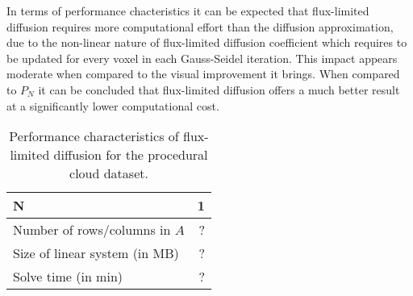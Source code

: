 In terms of performance chacteristics it can be expected that flux-limited diffusion requires more computational effort than the diffusion approximation, due to the non-linear nature of flux-limited diffusion coefficient which requires to be updated for every voxel in each Gauss-Seidel iteration. This impact appears moderate when compared to the visual improvement it brings. When compared to $P_N$ it can be concluded that flux-limited diffusion offers a much better result at a significantly lower computational cost.
\begin{table}[!h]
	\centering
	\caption[TODO]{Performance characteristics of flux-limited diffusion for the procedural cloud dataset.}
	\label{tab:results_cloud}
	\begin{tabular}{l r}
    \hline
	\textbf{N}
    & 1
    \\
    \hline
    Number of rows/columns in $A$
    & ?
    \\
    Size of linear system (in MB)
    & ?
    \\
    Solve time (in min)
    & ?
	\end{tabular}
\end{table}
